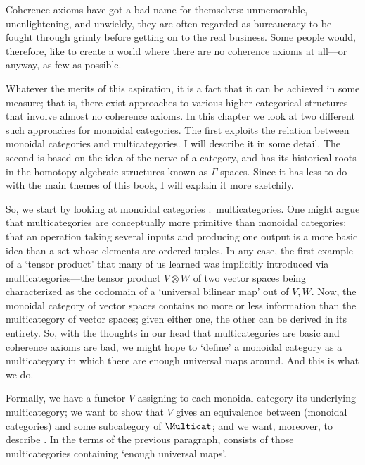 Coherence%
%
%
axioms have got a bad name for themselves: unmemorable,
unenlightening, and unwieldy, they are often regarded as bureaucracy to be
fought through grimly before getting on to the real business.  Some people
would, therefore, like to create a world where there are no coherence
axioms at all---or anyway, as few as possible.

Whatever the merits of this aspiration, it is a fact that it can be
achieved in some measure; that is, there exist approaches to various higher
categorical structures that involve almost no coherence axioms.  In this
chapter we look at two different such approaches for monoidal categories.
The first exploits the relation between monoidal categories and
multicategories.  I will describe it in some detail.  The second is based
on the idea of the nerve of a category, and has its historical roots in the
homotopy-algebraic structures known as $\Gamma$-spaces.  Since it has less
to do with the main themes of this book, I will explain it more sketchily.

%
%
So, we start by looking at monoidal categories \vs.\
multicategories.  One might argue that multicategories are conceptually
more primitive than monoidal categories: that an operation taking several
inputs and producing one output is a more basic idea than a set whose
elements are ordered tuples.  In any case, the first example of a `tensor%
%
%
product' that many of us learned was implicitly introduced via
multicategories---the tensor product $V\otimes W$ of two vector spaces
being characterized as the codomain of a `universal bilinear map' out of
$V, W$.  Now, the monoidal category of vector spaces contains no more or
less information than the multicategory of vector spaces; given either one,
the other can be derived in its entirety.  So, with the thoughts in our
head that multicategories are basic and coherence axioms are bad, we might
hope to `define' a monoidal category as a multicategory in which there are
enough universal maps around.  And this is what we do.

Formally, we have a functor $V$%
% 
% 
assigning to each monoidal category its
underlying multicategory; we want to show that $V$ gives an equivalence
between (monoidal categories) and some subcategory  of $\Multicat$;
and we want, moreover, to describe .  In the terms of the previous
paragraph, \cat{R} consists of those multicategories containing `enough
universal maps'.

